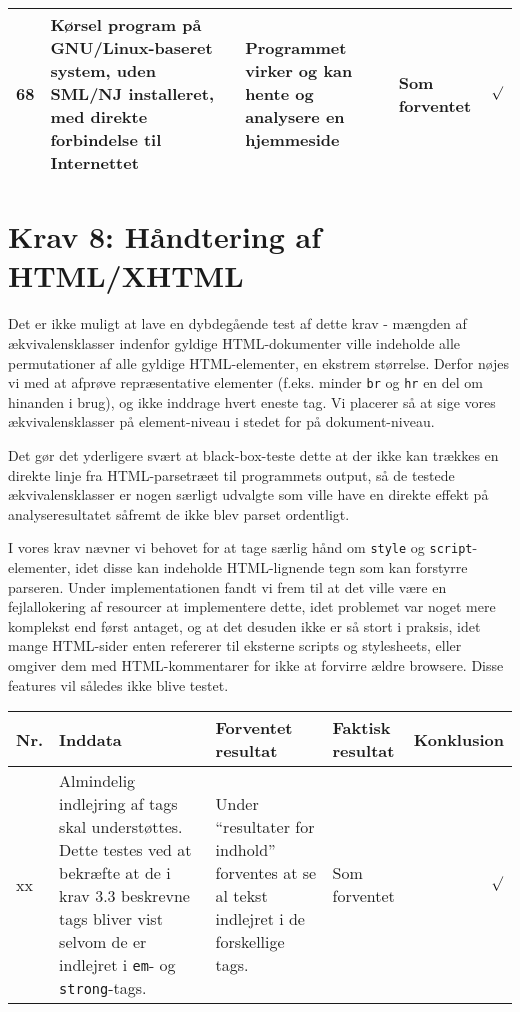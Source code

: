 \documentclass[a4paper,oneside,article]{memoir}
\begin{document}
\begin{landscape}
\begin{longtable}[c]{p{20pt}|p{220pt}|p{130pt}|p{130pt}|r}
68 &
Kørsel program på GNU/Linux-baseret system, uden SML/NJ installeret, med direkte forbindelse til
Internettet &
Programmet virker og kan hente og analysere en hjemmeside &
Som forventet &
$\surd$ \\ \hline

\end{longtable}

\section{Krav 8: Håndtering af HTML/XHTML}

Det er ikke muligt at lave en dybdegående test af dette krav - mængden
af ækvivalensklasser indenfor gyldige HTML-dokumenter ville indeholde
alle permutationer af alle gyldige HTML-elementer, en ekstrem
størrelse. Derfor nøjes vi med at afprøve repræsentative elementer
(f.eks. minder \texttt{br} og \texttt{hr} en del om hinanden i brug),
og ikke inddrage hvert eneste tag. Vi placerer så at sige vores
ækvivalensklasser på element-niveau i stedet for på dokument-niveau.

Det gør det yderligere svært at black-box-teste dette at der ikke kan
trækkes en direkte linje fra HTML-parsetræet til programmets output,
så de testede ækvivalensklasser er nogen særligt udvalgte som ville
have en direkte effekt på analyseresultatet såfremt de ikke blev
parset ordentligt.

I vores krav nævner vi behovet for at tage særlig hånd om
\texttt{style} og \texttt{script}-elementer, idet disse kan indeholde
HTML-lignende tegn som kan forstyrre parseren. Under implementationen
fandt vi frem til at det ville være en fejlallokering af resourcer at
implementere dette, idet problemet var noget mere komplekst end først
antaget, og at det desuden ikke er så stort i praksis, idet mange
HTML-sider enten refererer til eksterne scripts og stylesheets, eller
omgiver dem med HTML-kommentarer for ikke at forvirre ældre
browsere. Disse features vil således ikke blive testet.

\begin{longtable}[c]{p{20pt}|p{220pt}|p{130pt}|p{130pt}|r}
\textbf{Nr.} &
\textbf{Inddata} &
\textbf{Forventet resultat} &
\textbf{Faktisk resultat} &
\textbf{Konklusion} \\ \hline

xx &
Almindelig indlejring af tags skal understøttes. 
Dette testes ved at bekræfte at de i krav 3.3 beskrevne tags bliver vist selvom de er indlejret i \texttt{em}- og \texttt{strong}-tags. &
Under ``resultater for indhold'' forventes at se al tekst indlejret i de forskellige tags. &
Som forventet &
$\surd$ \\ \hline


\end{longtable}
\end{landscape}
\end{document}
